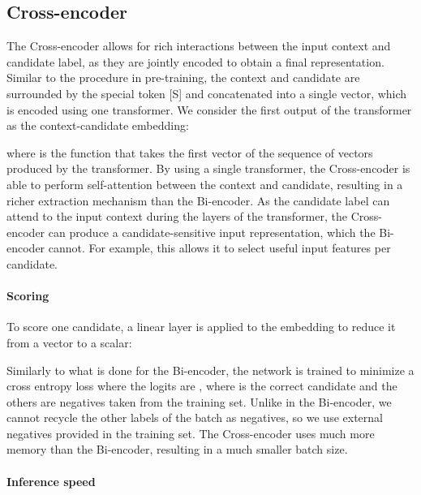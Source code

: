 \documentclass{article} \usepackage{iclr2020_conference,times}
\begin{document}
\subsection{Cross-encoder}
\label{subsection:Cross_Encoder}
The Cross-encoder allows for rich interactions between the input context and candidate label, as they are jointly encoded to obtain a final representation. 
Similar to the procedure in pre-training, the context and candidate are surrounded by the special token [S] and concatenated into a single vector, which is encoded using one transformer. We consider the first output of the transformer as the context-candidate embedding:

where  is the  function that takes the first vector of the sequence of vectors produced by the transformer. By using a single transformer, the Cross-encoder is able to perform self-attention between the context and candidate, resulting in a richer extraction mechanism than the Bi-encoder. As the candidate label can attend to the input context during the layers of the transformer, the Cross-encoder can produce a candidate-sensitive input representation, which the Bi-encoder cannot. For example, this allows it to select useful input features per candidate. 

\paragraph{Scoring}
To score one candidate, a linear layer  is applied to the embedding  to reduce it from a vector to a scalar: 


Similarly to what is done for the Bi-encoder, the network is trained to minimize a cross entropy loss where the logits are , where  is the correct candidate and the others are negatives taken from the training set. Unlike in the Bi-encoder, we cannot recycle the other labels of the batch as negatives, so we use external negatives provided in the training set. The Cross-encoder uses much more memory than the Bi-encoder, resulting in a much smaller batch size.

\paragraph{Inference speed}
\end{document}
